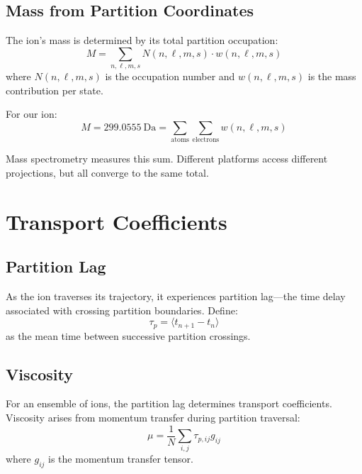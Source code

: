 \documentclass[12pt,a4paper]{article}
\theoremstyle{remark}
\begin{document}
\subsection{Mass from Partition Coordinates}

The ion's mass is determined by its total partition occupation:
\begin{equation}
M = \sum_{n,\ell,m,s} N(n,\ell,m,s) \cdot w(n,\ell,m,s)
\end{equation}
where $N(n,\ell,m,s)$ is the occupation number and $w(n,\ell,m,s)$ is the mass contribution per state.

For our ion:
\begin{equation}
M = 299.0555~\text{Da} = \sum_{\text{atoms}} \sum_{\text{electrons}} w(n,\ell,m,s)
\end{equation}

Mass spectrometry measures this sum. Different platforms access different projections, but all converge to the same total.


\section{Transport Coefficients}
\label{sec:transport}

\subsection{Partition Lag}

As the ion traverses its trajectory, it experiences partition lag---the time delay associated with crossing partition boundaries. Define:
\begin{equation}
\tau_p = \langle t_{n+1} - t_n \rangle
\end{equation}
as the mean time between successive partition crossings.

\subsection{Viscosity}

For an ensemble of ions, the partition lag determines transport coefficients. Viscosity arises from momentum transfer during partition traversal:
\begin{equation}
\mu = \frac{1}{N} \sum_{i,j} \tau_{p,ij} g_{ij}
\end{equation}
where $g_{ij}$ is the momentum transfer tensor.
\end{document}
